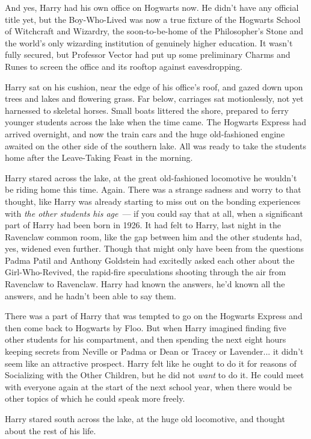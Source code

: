 And yes, Harry had his own office on Hogwarts now. He didn't have any official title yet, but the Boy-Who-Lived was now a true fixture of the Hogwarts School of Witchcraft and Wizardry, the soon-to-be-home of the Philosopher's Stone and the world's only wizarding institution of genuinely higher education. It wasn't fully secured, but Professor Vector had put up some preliminary Charms and Runes to screen the office and its rooftop against eavesdropping.

Harry sat on his cushion, near the edge of his office's roof, and gazed down upon trees and lakes and flowering grass. Far below, carriages sat motionlessly, not yet harnessed to skeletal horses. Small boats littered the shore, prepared to ferry younger students across the lake when the time came. The Hogwarts Express had arrived overnight, and now the train cars and the huge old-fashioned engine awaited on the other side of the southern lake. All was ready to take the students home after the Leave-Taking Feast in the morning.

Harry stared across the lake, at the great old-fashioned locomotive he wouldn't be riding home this time. Again. There was a strange sadness and worry to that thought, like Harry was already starting to miss out on the bonding experiences with \emph{the other students his age}~--- if you could say that at all, when a significant part of Harry had been born in 1926. It had felt to Harry, last night in the Ravenclaw common room, like the gap between him and the other students had, yes, widened even further. Though that might only have been from the questions Padma Patil and Anthony Goldstein had excitedly asked each other about the Girl-Who-Revived, the rapid-fire speculations shooting through the air from Ravenclaw to Ravenclaw. Harry had known the answers, he'd known all the answers, and he hadn't been able to say them.

There was a part of Harry that was tempted to go on the Hogwarts Express and then come back to Hogwarts by Floo. But when Harry imagined finding five other students for his compartment, and then spending the next eight hours keeping secrets from Neville or Padma or Dean or Tracey or Lavender... it didn't seem like an attractive prospect. Harry felt like he ought to do it for reasons of Socializing with the Other Children, but he did not \emph{want} to do it. He could meet with everyone again at the start of the next school year, when there would be other topics of which he could speak more freely.

Harry stared south across the lake, at the huge old locomotive, and thought about the rest of his life.

